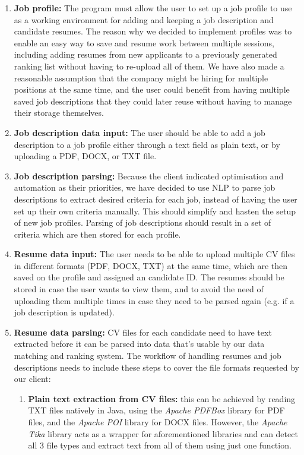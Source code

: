         \begin{enumerate}
            \item \textbf{Job profile:} The program must allow the user to set up a job profile to use as a working environment for adding and keeping a job description and candidate resumes. The reason why we decided to implement profiles was to enable an easy way to save and resume work between multiple sessions, including adding resumes from new applicants to a previously generated ranking list without having to re-upload all of them. We have also made a reasonable assumption that the company might be hiring for multiple positions at the same time, and the user could benefit from having multiple saved job descriptions that they could later reuse without having to manage their storage themselves.
            \item \textbf{Job description data input:} The user should be able to add a job description to a job profile either through a text field as plain text, or by uploading a PDF, DOCX, or TXT file.
            \item \textbf{Job description parsing:} Because the client indicated optimisation and automation as their priorities, we have decided to use NLP to parse job descriptions to extract desired criteria for each job, instead of having the user set up their own criteria manually. This should simplify and hasten the setup of new job profiles. Parsing of job descriptions should result in a set of criteria which are then stored for each profile.
            \item \textbf{Resume data input:} The user needs to be able to upload multiple CV files in different formats (PDF, DOCX, TXT) at the same time, which are then saved on the profile and assigned an candidate ID. The resumes should be stored in case the user wants to view them, and to avoid the need of uploading them multiple times in case they need to be parsed again (e.g. if a job description is updated).
            \item \textbf{Resume data parsing:} CV files for each candidate need to have text extracted before it can be parsed into data that's usable by our data matching and ranking system. The workflow of handling resumes and job descriptions needs to include these steps to cover the file formats requested by our client:
                \begin{enumerate}
                    \item \textbf{Plain text extraction from CV files:} this can be achieved by reading TXT files natively in Java, using the \textit{Apache PDFBox} library for PDF files, and the \textit{Apache POI} library for DOCX files. However, the \textit{Apache Tika} library acts as a wrapper for aforementioned libraries and can detect all 3 file types and extract text from all of them using just one function.

\end{enumerate}
\end{enumerate}
